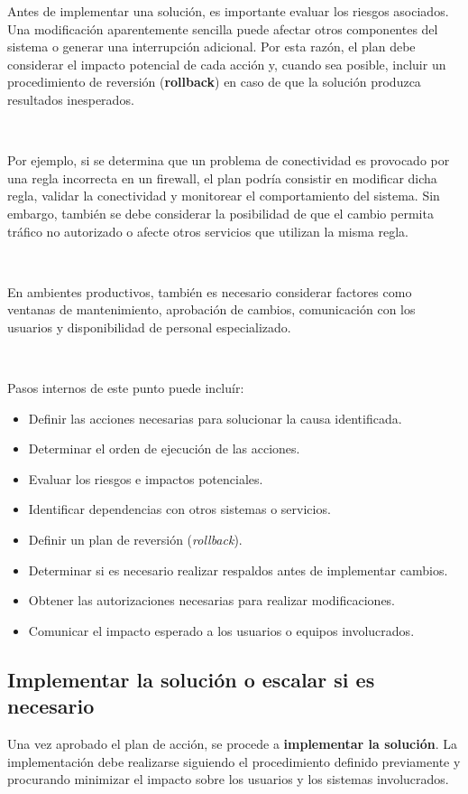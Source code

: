 \documentclass[a4paper,10pt]{article}
\begin{document}
Antes de implementar una solución, es importante evaluar los riesgos asociados. 
Una modificación aparentemente sencilla puede afectar otros componentes del sistema o generar una interrupción adicional. 
Por esta razón, el plan debe considerar el impacto potencial de cada acción y, cuando sea posible, incluir un procedimiento de reversión (\textbf{rollback}) en caso de que la solución produzca resultados inesperados.

\

Por ejemplo, si se determina que un problema de conectividad es provocado por una regla incorrecta en un firewall, el plan podría consistir en modificar dicha regla, 
validar la conectividad y monitorear el comportamiento del sistema. Sin embargo, también se debe considerar la posibilidad de que el cambio permita tráfico no autorizado o afecte otros servicios que utilizan la misma regla.

\

En ambientes productivos, también es necesario considerar factores como ventanas de mantenimiento, 
aprobación de cambios, comunicación con los usuarios y disponibilidad de personal especializado.

\

Pasos internos de este punto puede incluír:

\begin{itemize}
    \item Definir las acciones necesarias para solucionar la causa identificada.
    \item Determinar el orden de ejecución de las acciones.
    \item Evaluar los riesgos e impactos potenciales.
    \item Identificar dependencias con otros sistemas o servicios.
    \item Definir un plan de reversión (\textit{rollback}).
    \item Determinar si es necesario realizar respaldos antes de implementar cambios.
    \item Obtener las autorizaciones necesarias para realizar modificaciones.
    \item Comunicar el impacto esperado a los usuarios o equipos involucrados.
\end{itemize}


\subsection{Implementar la solución o escalar si es necesario}
Una vez aprobado el plan de acción, se procede a \textbf{implementar la solución}. 
La implementación debe realizarse siguiendo el procedimiento definido previamente y procurando minimizar el impacto sobre los usuarios y los sistemas involucrados.
\end{document}
